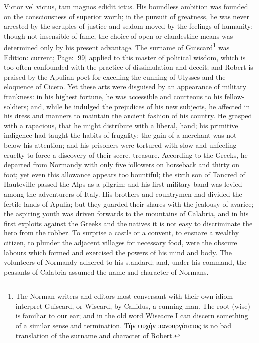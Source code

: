 {Victor vel victus, tam magnos edidit ictus.} His boundless ambition was founded on the consciousness of superior worth; in the pursuit of greatness, he was never arrested by the scruples of justice and seldom moved by the feelings of humanity; though not insensible of fame, the choice of open or clandestine means was determined only by his present advantage. The surname of Guiscard\footnote{The Norman writers and editors most conversant with their own idiom interpret Guiscard, or Wiscard, by Callidus, a cunning man. The root (wise) is familiar to our ear; and in the old word Wiseacre I can discern something of a similar sense and termination. \textgreek{Τ\texthebrew{ὴ}ν ψυχ\texthebrew{ὴ}ν πανουργότατος} is no bad translation of the surname and character of Robert.} was Edition: current; Page: [99] applied to this master of political wisdom, which is too often confounded with the practice of dissimulation and deceit; and Robert is praised by the Apulian poet for excelling the cunning of Ulysses and the eloquence of Cicero. Yet these arts were disguised by an appearance of military frankness: in his highest fortune, he was accessible and courteous to his fellow-soldiers; and, while he indulged the prejudices of his new subjects, he affected in his dress and manners to maintain the ancient fashion of his country. He grasped with a rapacious, that he might distribute with a liberal, hand; his primitive indigence had taught the habits of frugality; the gain of a merchant was not below his attention; and his prisoners were tortured with slow and unfeeling cruelty to force a discovery of their secret treasure. According to the Greeks, he departed from Normandy with only five followers on horseback and thirty on foot; yet even this allowance appears too bountiful; the sixth son of Tancred of Hauteville passed the Alps as a pilgrim; and his first military band was levied among the adventurers of Italy. His brothers and countrymen had divided the fertile lands of Apulia; but they guarded their shares with the jealousy of avarice; the aspiring youth was driven forwards to the mountains of Calabria, and in his first exploits against the Greeks and the natives it is not easy to discriminate the hero from the robber. To surprise a castle or a convent, to ensnare a wealthy citizen, to plunder the adjacent villages for necessary food, were the obscure labours which formed and exercised the powers of his mind and body. The volunteers of Normandy adhered to his standard; and, under his command, the peasants of Calabria assumed the name and character of Normans.

